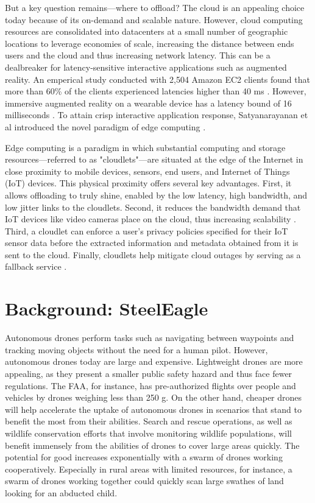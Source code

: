 But a key question remains---where to offload? The cloud is an
appealing choice today because of its on-demand and scalable nature. However,
cloud computing resources are consolidated into datacenters at a small number
of geographic locations to leverage economies of scale, increasing the distance
between ends users and the cloud and thus increasing network latency. This can
be a dealbreaker for latency-sensitive interactive applications such as
augmented reality. An emperical study conducted with 2,504 Amazon EC2 clients
found that more than 60\% of the clients experienced latencies higher than 40
ms \cite{choy2012}. However, immersive augmented reality on a wearable device
has a latency bound of 16 milliseconds \cite{ellis2004}.
To attain crisp interactive application response,
Satyanarayanan et al introduced the novel paradigm of edge computing
\cite{satya2009}.


Edge computing is a paradigm in which substantial computing and storage
resources---referred to as "cloudlets"---are situated at the edge of the
Internet in close proximity to mobile devices, sensors, end users, and Internet
of Things (IoT) devices. This physical proximity offers several key advantages.
First, it allows offloading to truly shine, enabled by the low latency, high
bandwidth, and low jitter links to the cloudlets. Second, it reduces the
bandwidth demand that IoT devices like video cameras place on the cloud, thus
increasing scalability \cite{premsankar2018}. Third, a cloudlet can enforce a
user's privacy policies specified for their IoT sensor data before the
extracted information and metadata obtained from it is sent to the cloud.
Finally, cloudlets help mitigate cloud outages by serving as a fallback service
\cite{satya2017}.

\section{Background: SteelEagle}

Autonomous drones perform tasks such as navigating between waypoints and
tracking moving objects without the need for a human pilot.  However,
autonomous drones today are large and expensive. Lightweight drones are more
appealing, as they present a smaller public safety hazard and thus face fewer
regulations. The FAA, for instance, has pre-authorized flights over people and
vehicles by drones weighing less than 250 g. On the other hand, cheaper drones
will help accelerate the uptake of autonomous drones in scenarios that stand to
benefit the most from their abilities. Search and rescue operations, as well as
wildlife conservation efforts that involve monitoring wildlife populations,
will benefit immensely from the abilities of drones to cover large areas
quickly. The potential for good increases exponentially with a swarm of drones
working cooperatively. Especially in rural areas with limited resources, for
instance, a swarm of drones working together could quickly scan large swathes
of land looking for an abducted child.

